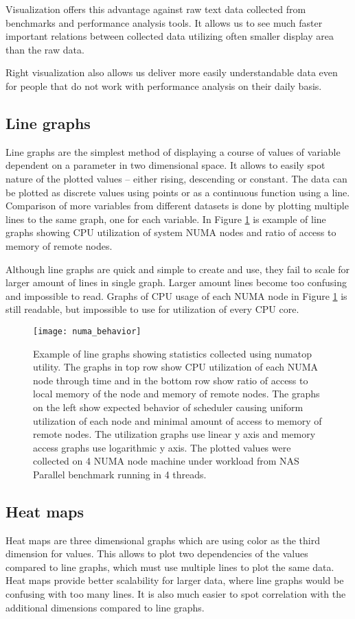 Visualization offers this advantage against raw text data collected from
benchmarks and performance analysis tools. It allows us to see much faster
important relations between collected data utilizing often smaller display area
than the raw data.

Right visualization also allows us deliver more easily understandable data even
for people that do not work with performance analysis on their daily basis.

\subsection{Line graphs}
Line graphs are the simplest method of displaying a course of values of variable
dependent on a parameter in two dimensional space. It allows to easily spot
nature of the plotted values -- either rising, descending or constant. The
data can be plotted as discrete values using points or as a continuous function
using a line. Comparison of more variables from different datasets is done by
plotting multiple lines to the same graph, one for each variable. In Figure
\ref{fig:linegraph} is example of line graphs showing CPU utilization of system
NUMA nodes and ratio of access to memory of remote nodes.

Although line graphs are quick and simple to create and use, they fail to scale
for larger amount of lines in single graph. Larger amount lines become too
confusing and impossible to read. Graphs of CPU usage of each NUMA node in
Figure \ref{fig:linegraph} is still readable, but impossible to use for
utilization of every CPU core.

\begin{figure}
  \centering
  \texttt{[image: numa\_behavior]}
  \caption{Example of line graphs showing statistics collected using numatop
    utility. The graphs in top row show CPU utilization of each NUMA node
    through time and in the bottom row show ratio of access to local memory of
    the node and memory of remote nodes. The graphs on the left show expected
    behavior of scheduler causing uniform utilization of each node and minimal
    amount of access to memory of remote nodes. The utilization graphs use
    linear y axis and memory access graphs use logarithmic y axis. The plotted
    values were collected on 4 NUMA node machine under workload from NAS
    Parallel benchmark running in 4 threads.}
  \label{fig:linegraph}
\end{figure}

\subsection{Heat maps}
Heat maps are three dimensional graphs which are using color as the third
dimension for values. This allows to plot two dependencies of the values
compared to line graphs, which must use multiple lines to plot the same data.
Heat maps provide better scalability for larger data, where line graphs would be
confusing with too many lines. It is also much easier to spot correlation
with the additional dimensions compared to line graphs.

